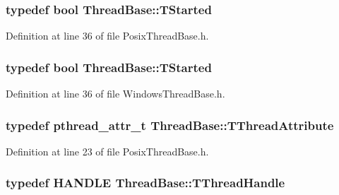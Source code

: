 \hypertarget{class_thread_base_ad8b410e3bc7320addea3c5b56ff6c985}{
\subsubsection[{T\-Started}]{\setlength{\rightskip}{0pt plus 5cm}typedef bool {\bf Thread\-Base\-::\-T\-Started}}}\label{class_thread_base_ad8b410e3bc7320addea3c5b56ff6c985}


Definition at line 36 of file Posix\-Thread\-Base.\-h.

\hypertarget{class_thread_base_ad8b410e3bc7320addea3c5b56ff6c985}{
\subsubsection[{T\-Started}]{\setlength{\rightskip}{0pt plus 5cm}typedef bool {\bf Thread\-Base\-::\-T\-Started}}}\label{class_thread_base_ad8b410e3bc7320addea3c5b56ff6c985}


Definition at line 36 of file Windows\-Thread\-Base.\-h.

\hypertarget{class_thread_base_adea5ffdf2c74b95dbfee5148248f93b8}{
\subsubsection[{T\-Thread\-Attribute}]{\setlength{\rightskip}{0pt plus 5cm}typedef pthread\-\_\-attr\-\_\-t {\bf Thread\-Base\-::\-T\-Thread\-Attribute}\hspace{0.3cm}{\ttfamily [private]}}}\label{class_thread_base_adea5ffdf2c74b95dbfee5148248f93b8}


Definition at line 23 of file Posix\-Thread\-Base.\-h.

\hypertarget{class_thread_base_ad87b599650c2062b6ff7e54934da7e2b}{
\subsubsection[{T\-Thread\-Handle}]{\setlength{\rightskip}{0pt plus 5cm}typedef H\-A\-N\-D\-L\-E {\bf Thread\-Base\-::\-T\-Thread\-Handle}\hspace{0.3cm}{\ttfamily [private]}}}\label{class_thread_base_ad87b599650c2062b6ff7e54934da7e2b}


